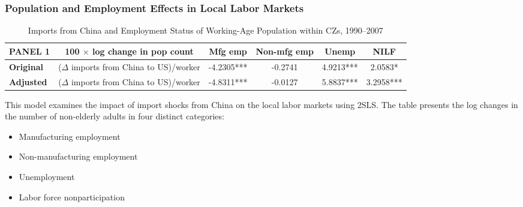 \begin{frame}
    \frametitle{Population and Employment Effects in Local Labor Markets}
    
    \begin{table}[h!]
        \centering
        \begin{adjustbox}{max width=\textwidth}
            \begin{tabular}{l c c c c c}
                \toprule
                \textbf{PANEL 1} & \textbf{100 $\times$ log change in pop count} & \textbf{Mfg emp} & \textbf{Non-mfg emp} & \textbf{Unemp} & \textbf{NILF} \\
                \midrule
                \textbf{Original} & ($\Delta$ imports from China to US)/worker & -4.2305*** & -0.2741 & 4.9213*** & 2.0583* \\
                \textbf{Adjusted} & ($\Delta$ imports from China to US)/worker & -4.8311*** & -0.0127 & 5.8837*** & 3.2958*** \\
                \bottomrule
            \end{tabular}
        \end{adjustbox}
        \caption{Imports from China and Employment Status of Working-Age Population within CZs, 1990–2007}
        \label{tab:panel_5}
    \end{table}

    This model examines the impact of import shocks from China on the local labor markets using 2SLS. The table presents the log changes in the number of non-elderly adults in four distinct categories:
        
    \begin{itemize}
        \item Manufacturing employment
        \item Non-manufacturing employment
        \item Unemployment
        \item Labor force nonparticipation
    \end{itemize}
\end{frame}

